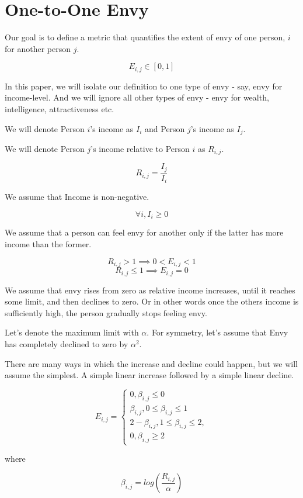 
\section{One-to-One Envy}
Our goal is to define a metric that quantifies the extent of envy of one person, $i$ for another person $j$. 

\begin{equation}
E_{i,j} \in [0,1]
\end{equation}

In this paper, we will isolate our definition to one type of envy - say, envy for income-level. And we will ignore all other types of envy - envy for wealth, intelligence, attractiveness etc.

We will denote Person $i$'s income as $I_i$ and Person $j$'s income as $I_j$. 

We will denote Person $j$'s income relative to Person $i$ as $R_{i,j}$.

\begin{equation}
    R_{i,j} = \frac{I_j}{I_i}
\end{equation}

We assume that Income is non-negative. 
    
\begin{equation}
    \forall i, I_i \ge 0
\end{equation}
    
We assume that a person can feel envy for another only if the latter has more income than  the former. 

\begin{equation}
    R_{i,j} > 1 \implies 0 < E_{i,j} < 1
\end{equation}
\begin{equation}
    R_{i,j} \le 1 \implies E_{i,j} = 0 
\end{equation}
 
We assume that envy rises from zero as relative income increases, until it reaches some limit, and then declines to zero. Or in other words once the others income is sufficiently high, the person gradually stops feeling envy. 

Let's denote the maximum limit with $\alpha$. For symmetry, let's assume that Envy has completely declined to zero by $\alpha^2$.

There are many ways in which the increase and decline could happen, but we will assume the simplest. A simple linear increase followed by a simple linear decline. 

\begin{equation}
    E_{i,j} = 
    \begin{cases}
        0, 
        \beta_{i,j} \le 0 \\
        \beta_{i,j}, 
        0 \le \beta_{i,j} \le 1 \\    
        2 - \beta_{i,j}, 
        1 \le \beta_{i,j} \le 2, \\
        0, 
        \beta_{i,j} \ge 2
    \end{cases}
\end{equation}

where 

\begin{equation}
    \beta_{i,j} = log(\frac{R_{i,j}}{\alpha})
\end{equation}